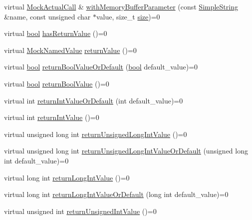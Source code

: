 \begin{DoxyCompactItemize}
\item 
virtual \hyperlink{class_mock_actual_call}{Mock\+Actual\+Call} \& \hyperlink{class_mock_actual_call_a37b0da9e740a7fdce52511f523dd770f}{with\+Memory\+Buffer\+Parameter} (const \hyperlink{class_simple_string}{Simple\+String} \&name, const unsigned char $\ast$value, size\+\_\+t \hyperlink{gst__avb__playbin_8c_a439227feff9d7f55384e8780cfc2eb82}{size})=0
\item 
virtual \hyperlink{avb__gptp_8h_af6a258d8f3ee5206d682d799316314b1}{bool} \hyperlink{class_mock_actual_call_a71af85d97bfa2dd6067eb5cd95df07a7}{has\+Return\+Value} ()=0
\item 
virtual \hyperlink{class_mock_named_value}{Mock\+Named\+Value} \hyperlink{class_mock_actual_call_a6c5987c6227778f648a3ee566cd09592}{return\+Value} ()=0
\item 
virtual \hyperlink{avb__gptp_8h_af6a258d8f3ee5206d682d799316314b1}{bool} \hyperlink{class_mock_actual_call_ad3a0e579b38ca4f1a84e32255095daf7}{return\+Bool\+Value\+Or\+Default} (\hyperlink{avb__gptp_8h_af6a258d8f3ee5206d682d799316314b1}{bool} default\+\_\+value)=0
\item 
virtual \hyperlink{avb__gptp_8h_af6a258d8f3ee5206d682d799316314b1}{bool} \hyperlink{class_mock_actual_call_a4562a0e3fcc9b4f78b9847c5143d0c0e}{return\+Bool\+Value} ()=0
\item 
virtual int \hyperlink{class_mock_actual_call_a1a3ea31ec29fa183139a2807b9c518c7}{return\+Int\+Value\+Or\+Default} (int default\+\_\+value)=0
\item 
virtual int \hyperlink{class_mock_actual_call_afd955f301819028de995be3ac3de5e98}{return\+Int\+Value} ()=0
\item 
virtual unsigned long int \hyperlink{class_mock_actual_call_ad52b241b95b1f12388c27d27fe108372}{return\+Unsigned\+Long\+Int\+Value} ()=0
\item 
virtual unsigned long int \hyperlink{class_mock_actual_call_af9283d759e5cfc0752550196b9d63dee}{return\+Unsigned\+Long\+Int\+Value\+Or\+Default} (unsigned long int default\+\_\+value)=0
\item 
virtual long int \hyperlink{class_mock_actual_call_a92a03bb2bbdce5cf3a430fbb989f4fcb}{return\+Long\+Int\+Value} ()=0
\item 
virtual long int \hyperlink{class_mock_actual_call_a63cf8eb70c1f55f95a714effcef1908a}{return\+Long\+Int\+Value\+Or\+Default} (long int default\+\_\+value)=0
\item 
virtual unsigned int \hyperlink{class_mock_actual_call_a8b5607c0e1f43fd9ee4859d0a00c2d73}{return\+Unsigned\+Int\+Value} ()=0

\end{DoxyCompactItemize}
